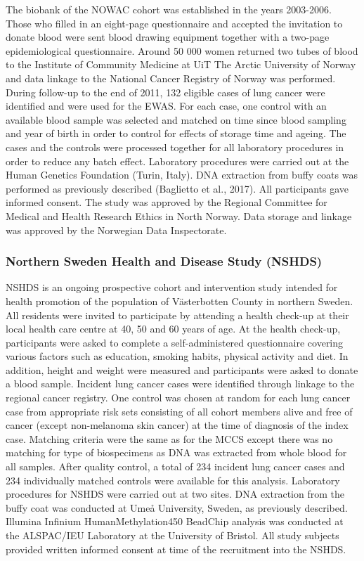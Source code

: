 \documentclass[11pt,twoside]{bristolthesis}
\begin{document}
The biobank of the NOWAC cohort was established in the years 2003-2006. Those who filled in an eight-page questionnaire and accepted the invitation to donate blood were sent blood drawing equipment together with a two-page epidemiological questionnaire. Around 50 000 women returned two tubes of blood to the Institute of Community Medicine at UiT The Arctic University of Norway and data linkage to the National Cancer Registry of Norway was performed. During follow-up to the end of 2011, 132 eligible cases of lung cancer were identified and were used for the EWAS. For each case, one control with an available blood sample was selected and matched on time since blood sampling and year of birth in order to control for effects of storage time and ageing. The cases and the controls were processed together for all laboratory procedures in order to reduce any batch effect. Laboratory procedures were carried out at the Human Genetics Foundation (Turin, Italy). DNA extraction from buffy coats was performed as previously described (Baglietto et al., 2017). All participants gave informed consent. The study was approved by the Regional Committee for Medical and Health Research Ethics in North Norway. Data storage and linkage was approved by the Norwegian Data Inspectorate.

\hypertarget{northern-sweden-health-and-disease-study-nshds}{%
\subsubsection{Northern Sweden Health and Disease Study (NSHDS)}\label{northern-sweden-health-and-disease-study-nshds}}

NSHDS is an ongoing prospective cohort and intervention study intended for health promotion of the population of Västerbotten County in northern Sweden. All residents were invited to participate by attending a health check-up at their local health care centre at 40, 50 and 60 years of age. At the health check-up, participants were asked to complete a self-administered questionnaire covering various factors such as education, smoking habits, physical activity and diet. In addition, height and weight were measured and participants were asked to donate a blood sample. Incident lung cancer cases were identified through linkage to the regional cancer registry. One control was chosen at random for each lung cancer case from appropriate risk sets consisting of all cohort members alive and free of cancer (except non-melanoma skin cancer) at the time of diagnosis of the index case. Matching criteria were the same as for the MCCS except there was no matching for type of biospecimens as DNA was extracted from whole blood for all samples. After quality control, a total of 234 incident lung cancer cases and 234 individually matched controls were available for this analysis. Laboratory procedures for NSHDS were carried out at two sites. DNA extraction from the buffy coat was conducted at Umeå University, Sweden, as previously described. Illumina Infinium HumanMethylation450 BeadChip analysis was conducted at the ALSPAC/IEU Laboratory at the University of Bristol. All study subjects provided written informed consent at time of the recruitment into the NSHDS.
\end{document}
